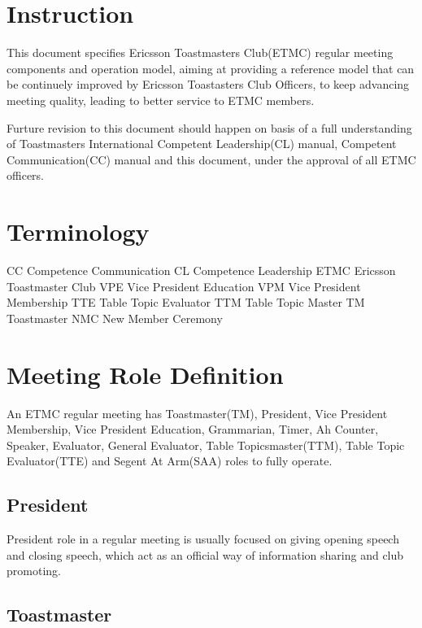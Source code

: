 
\section{Instruction}

This document specifies Ericsson Toastmasters Club(ETMC) regular meeting 
components and operation model, aiming at providing a reference model
that can be continuely improved by Ericsson Toastasters Club Officers, 
to keep advancing meeting quality, leading to better service to ETMC 
members.

Furture revision to this document should happen on basis of a full 
understanding of Toastmasters International Competent Leadership(CL)
manual, Competent Communication(CC) manual and this document, under
the approval of all ETMC officers.

\section{Terminology}

CC   Competence Communication
CL   Competence Leadership
ETMC Ericsson Toastmaster Club
VPE  Vice President Education
VPM  Vice President Membership
TTE  Table Topic Evaluator
TTM  Table Topic Master
TM   Toastmaster
NMC  New Member Ceremony

\section{Meeting Role Definition}

An ETMC regular meeting has Toastmaster(TM), President, Vice President 
Membership, Vice President Education, Grammarian, Timer, Ah Counter,
Speaker, Evaluator, General Evaluator, Table Topicsmaster(TTM), Table 
Topic Evaluator(TTE) and Segent At Arm(SAA) roles to fully operate.  



\subsection{President}

President role in a regular meeting is usually focused on giving opening 
speech and closing speech, which act as an official way of information 
sharing and club promoting.

\subsection{Toastmaster}

